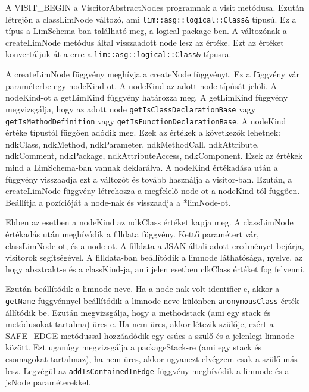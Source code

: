 A VISIT\_BEGIN a ViscitorAbstractNodes programnak a visit metódusa.
Ezután létrejön a classLimNode változó, ami \texttt{lim::asg::logical::Class\&} típusú.
Ez a típus a LimSchema-ban található meg, a logical package-ben.
A változónak a createLimNode metódus által visszaadott node lesz az értéke.
Ezt az értéket konvertáljuk át a erre a \texttt{lim::asg::logical::Class\&} típusra.

\noindent

A createLimNode függvény meghívja a createNode függvényt. Ez a függvény vár paraméterbe egy nodeKind-ot.
A nodeKind az adott node típúsát jelöli.
A nodeKind-ot a getLimKind függvény határozza meg.
A getLimKind függvény megvizsgálja, hogy az adott node \texttt{getIsClassDeclarationBase} vagy \texttt{getIsMethodDefinition} vagy \texttt{getIsFunctionDeclarationBase}.
A nodeKind értéke típustól függően adódik meg.
Ezek az értékek a következők lehetnek: ndkClass, ndkMethod, ndkParameter, ndkMethodCall, ndkAttribute, ndkComment, ndkPackage, ndkAttributeAccess, ndkComponent.
Ezek az értékek mind a LimSchema-ban vannak deklarálva. A nodeKind értékadása után a függvény visszaadja ezt a változót és tovább használja a visitor-ban.
Ezután, a createLimNode függvény létrehozza a megfelelő node-ot a nodeKind-tól függően. Beállítja a pozícióját a node-nak és visszaadja a *limNode-ot.

\noindent

Ebben az esetben a nodeKind az ndkClass értéket kapja meg.
A classLimNode értékadás után meghívódik a filldata függvény.
Kettő paramétert vár, classLimNode-ot, és a node-ot.
A filldata a JSAN általi adott eredményet bejárja, visitorok segítségével.
A filldata-ban beállítódik a limnode láthatósága, nyelve, az hogy absztrakt-e és a classKind-ja, ami jelen esetben clkClass értéket fog felvenni.

Ezután beállítódik a limnode neve. Ha a node-nak volt identifier-e, akkor a \texttt{getName} függvénnyel beállítódik a limnode neve különben \texttt{anonymousClass} érték állítódik be.
Ezután megvizsgálja, hogy a methodstack (ami egy stack és metódusokat tartalma) üres-e.
Ha nem üres, akkor létezik szülője, ezért a SAFE\_EDGE metódussal hozzáadódik egy csúcs a szülő és a jelenlegi limnode között.
Ezt uganúgy megvizsgálja a  packageStack-re (ami egy stack és csomagokat tartalmaz), ha nem üres, akkor ugyanezt elvégzem csak a szülő más lesz.
Legvégül az \texttt{addIsContainedInEdge} függvény meghívódik a limnode és a jsNode paraméterekkel.

\noindent

